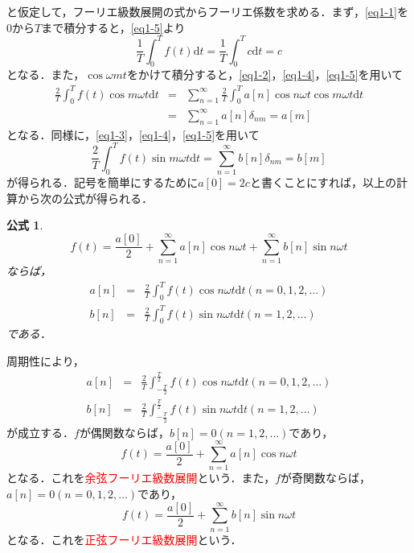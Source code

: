 \documentclass[a4j]{jsbook}
\newtheorem{formula}[theorem]{公式}
\numberwithin{theorem}{chapter}  %
\begin{document}
と仮定して，フーリエ級数展開の式からフーリエ係数を求める．まず，\eqref{eq1-1}を0から\(T\)まで積分すると，\eqref{eq1-5}より
\begin{equation*}
    \frac{1}{T}\int_0^T f(t)\mathrm{d}t=\frac{1}{T}\int_0^T c\mathrm{d}t=c
\end{equation*}
となる．また，\(\cos\omega mt\)をかけて積分すると，\eqref{eq1-2}，\eqref{eq1-4}，\eqref{eq1-5}を用いて
\begin{eqnarray*}
\frac{2}{T}\int_0^T f(t)\cos m\omega t\mathrm{d}t&=&\sum_{n=1}^\infty\frac{2}{T}\int_0^T a[n]\cos n\omega t\cos m\omega t\mathrm{d}t \\
&=&\sum_{n=1}^\infty a[n]\delta_{nm}=a[m]
\end{eqnarray*}
となる．同様に，\eqref{eq1-3}，\eqref{eq1-4}，\eqref{eq1-5}を用いて
\begin{equation*}
    \frac{2}{T}\int_0^T f(t)\sin m\omega t\mathrm{d}t=\sum_{n=1}^\infty b[n]\delta_{nm}=b[m]
\end{equation*}
が得られる．記号を簡単にするために\(a[0]=2c\)と書くことにすれば，以上の計算から次の公式が得られる．
\begin{formula}
\label{formula1-2}
\begin{equation}
    f(t)=\frac{a[0]}{2}+\sum_{n=1}^\infty a[n]\cos n\omega t+\sum_{n=1}^\infty b[n]\sin n\omega t \label{eq1-6}
\end{equation}
ならば，
\begin{eqnarray}
a[n]&=&\frac{2}{T}\int_0^T f(t)\cos n\omega t\mathrm{d}t (n=0, 1, 2, \dots) \\
b[n]&=&\frac{2}{T}\int_0^T f(t)\sin n\omega t\mathrm{d}t (n=1, 2, \dots)
\end{eqnarray}
である．
\end{formula}
周期性により，
\begin{eqnarray}
a[n]&=&\frac{2}{T}\int_{-\frac{T}{2}}^{\frac{T}{2}} f(t)\cos n\omega t\mathrm{d}t (n=0, 1, 2, \dots) \\
b[n]&=&\frac{2}{T}\int_{-\frac{T}{2}}^{\frac{T}{2}} f(t)\sin n\omega t\mathrm{d}t (n=1, 2, \dots)
\end{eqnarray}
が成立する．\(f\)が偶関数ならば，\(b[n]=0(n=1, 2, \ldots)\)であり，
\begin{equation*}
    f(t)=\frac{a[0]}{2}+\sum_{n=1}^\infty a[n]\cos n\omega t
\end{equation*}
となる．これを\textcolor{red}{余弦フーリエ級数展開}という．また，\(f\)が奇関数ならば，\(a[n]=0(n=0, 1, 2, \ldots)\)であり，
\begin{equation*}
    f(t)=\frac{a[0]}{2}+\sum_{n=1}^\infty b[n]\sin n\omega t
\end{equation*}
となる．これを\textcolor{red}{正弦フーリエ級数展開}という．
\end{document}
